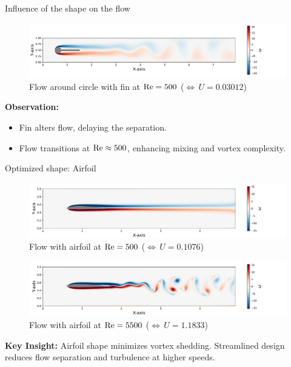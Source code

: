 \begin{frame}{Influence of the shape on the flow}
    \begin{figure}
        \centering
        \hspace*{0.3cm}
        \includegraphics[width=1.1\linewidth]{graphics/numeric/vor_30_circlefin.pdf}
        \vspace{-0.7cm}
        \caption{Flow around circle with fin at $\mathrm{Re} = 500$ ($ \Leftrightarrow\, U = 0.03012$)}
    \end{figure}
    \textbf{Observation:}
    \begin{itemize}
        \item Fin alters flow, delaying the separation.
        \item Flow transitions at $\mathrm{Re} \approx 500$, enhancing mixing and vortex complexity.    
    \end{itemize}
\end{frame}

\begin{frame}{Optimized shape: Airfoil}
    
    \begin{figure}
        \centering
        \hspace*{0.3cm}
        \includegraphics[width=1.1\linewidth]{graphics/numeric/RE3500_30_airfoil.pdf} %
        \vspace{-0.7cm}
        \caption{Flow with airfoil at $\mathrm{Re} = 500$ ($ \Leftrightarrow\, U = 0.1076$)}
    \end{figure}
    \vspace{-0.7cm}
    \begin{figure}
        \centering
        \hspace*{0.3cm}
        \includegraphics[width=1.1\linewidth]{graphics/numeric/RE5500_30_airfoil.pdf} %
        \vspace{-0.7cm}
        \caption{Flow with airfoil at $\mathrm{Re} = 5500$ ($ \Leftrightarrow\, U = 1.1833$)}
    \end{figure}
    \vspace{-0.3cm}
    \textbf{Key Insight:} Airfoil shape minimizes vortex shedding. Streamlined design reduces flow separation and turbulence at higher speeds.
\end{frame}